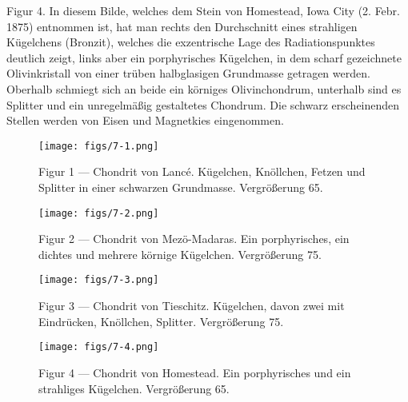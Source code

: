 \documentclass[a4paper, 12pt, oneside]{article}
\begin{document}
Figur 4. In diesem Bilde, welches dem Stein von Homestead, Iowa City (2. Febr. 1875) entnommen ist, hat man rechts den Durchschnitt eines strahligen Kügelchens (Bronzit), welches die exzentrische Lage des Radiationspunktes deutlich zeigt, links aber ein porphyrisches Kügelchen, in dem scharf gezeichnete Olivinkristall von einer trüben halbglasigen Grundmasse getragen werden. Oberhalb schmiegt sich an beide ein körniges Olivinchondrum, unterhalb sind es Splitter und ein unregelmäßig gestaltetes Chondrum. Die schwarz erscheinenden Stellen werden von Eisen und Magnetkies eingenommen.
\clearpage

\vspace*{\fill}
\begin{figure}[H]
\centering
\texttt{[image: figs/7-1.png]}
\caption{\small Figur 1 --- Chondrit von Lancé. Kügelchen, Knöllchen, Fetzen und Splitter in einer schwarzen Grundmasse. Vergrößerung 65.}
\end{figure}
\vspace*{\fill}
\clearpage

\vspace*{\fill}
\begin{figure}[H]
\centering
\texttt{[image: figs/7-2.png]}
\caption{\small Figur 2 --- Chondrit von Mezö-Madaras. Ein porphyrisches, ein dichtes und mehrere körnige Kügelchen. Vergrößerung 75.}
\end{figure}
\vspace*{\fill}
\clearpage

\vspace*{\fill}
\begin{figure}[H]
\centering
\texttt{[image: figs/7-3.png]}
\caption{\small Figur 3 --- Chondrit von Tieschitz. Kügelchen, davon zwei mit Eindrücken, Knöllchen, Splitter. Vergrößerung 75.}
\end{figure}
\vspace*{\fill}
\clearpage

\vspace*{\fill}
\begin{figure}[H]
\centering
\texttt{[image: figs/7-4.png]}
\caption{\small Figur 4 --- Chondrit von Homestead. Ein porphyrisches und ein strahliges Kügelchen. Vergrößerung 65.}
\end{figure}
\vspace*{\fill}
\clearpage
\end{document}
